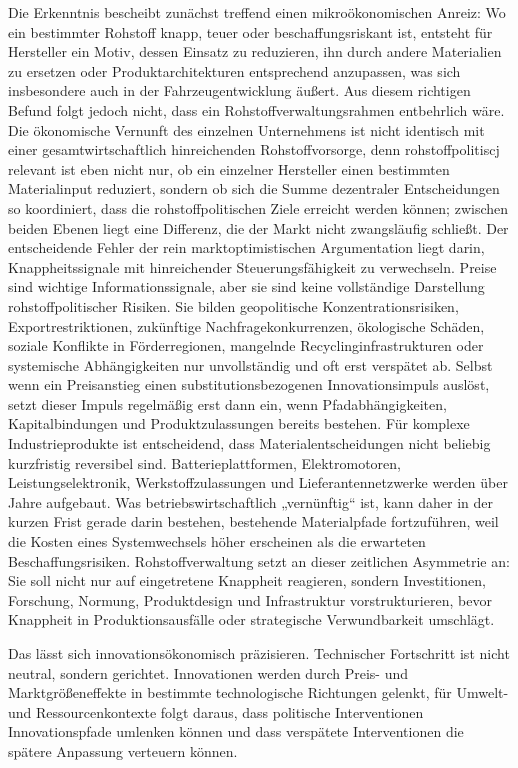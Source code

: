 \documentclass[12pt,a4paper,oneside]{book} %
\begin{document}
{Die Erkenntnis bescheibt zunächst treffend einen mikroökonomischen Anreiz: Wo ein bestimmter Rohstoff knapp, teuer oder beschaffungsriskant ist, entsteht für Hersteller ein Motiv, dessen Einsatz zu reduzieren, ihn durch andere Materialien zu ersetzen oder Produktarchitekturen entsprechend anzupassen, was sich insbesondere auch in der Fahrzeugentwicklung äußert. Aus diesem richtigen Befund folgt jedoch nicht, dass ein Rohstoffverwaltungsrahmen entbehrlich wäre. Die ökonomische Vernunft des einzelnen Unternehmens ist nicht identisch mit einer gesamtwirtschaftlich hinreichenden Rohstoffvorsorge, denn rohstoffpolitiscj relevant ist eben nicht nur, ob ein einzelner Hersteller einen bestimmten Materialinput reduziert, sondern ob sich die Summe dezentraler Entscheidungen so koordiniert, dass die rohstoffpolitischen Ziele erreicht werden können; zwischen beiden Ebenen liegt eine Differenz, die der Markt nicht zwangsläufig schließt. Der entscheidende Fehler der rein marktoptimistischen Argumentation liegt darin, Knappheitssignale mit hinreichender Steuerungsfähigkeit zu verwechseln. Preise sind wichtige Informationssignale, aber sie sind keine vollständige Darstellung rohstoffpolitischer Risiken. Sie bilden geopolitische Konzentrationsrisiken, Exportrestriktionen, zukünftige Nachfragekonkurrenzen, ökologische Schäden, soziale Konflikte in Förderregionen, mangelnde Recyclinginfrastrukturen oder systemische Abhängigkeiten nur unvollständig und oft erst verspätet ab. Selbst wenn ein Preisanstieg einen substitutionsbezogenen Innovationsimpuls auslöst, setzt dieser Impuls regelmäßig erst dann ein, wenn Pfadabhängigkeiten, Kapitalbindungen und Produktzulassungen bereits bestehen. Für komplexe Industrieprodukte ist entscheidend, dass Materialentscheidungen nicht beliebig kurzfristig reversibel sind. Batterieplattformen, Elektromotoren, Leistungselektronik, Werkstoffzulassungen und Lieferantennetzwerke werden über Jahre aufgebaut. Was betriebswirtschaftlich „vernünftig“ ist, kann daher in der kurzen Frist gerade darin bestehen, bestehende Materialpfade fortzuführen, weil die Kosten eines Systemwechsels höher erscheinen als die erwarteten Beschaffungsrisiken. Rohstoffverwaltung setzt an dieser zeitlichen Asymmetrie an: Sie soll nicht nur auf eingetretene Knappheit reagieren, sondern Investitionen, Forschung, Normung, Produktdesign und Infrastruktur vorstrukturieren, bevor Knappheit in Produktionsausfälle oder strategische Verwundbarkeit umschlägt.

Das lässt sich innovationsökonomisch präzisieren. Technischer Fortschritt ist nicht neutral, sondern gerichtet. Innovationen werden durch Preis- und Marktgrößeneffekte in bestimmte technologische Richtungen gelenkt, für Umwelt- und Ressourcenkontexte folgt daraus, dass politische Interventionen Innovationspfade umlenken können und dass verspätete Interventionen die spätere Anpassung verteuern können.\autocite{Acemoglu, directed technical change}

}
\end{document}
